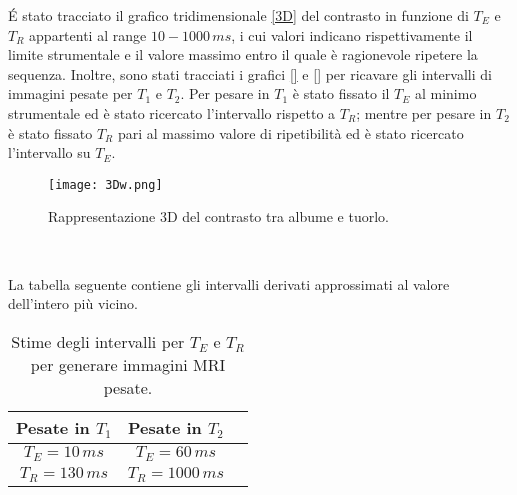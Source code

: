 \'E stato tracciato il grafico tridimensionale \ref{3D} del contrasto in funzione di $T_E$ e $T_R$ appartenti al range $10-1000\,ms$, i cui valori indicano rispettivamente il limite strumentale e il valore massimo entro il quale è ragionevole ripetere la sequenza. 
Inoltre, sono stati tracciati i grafici \ref{} e \ref{} per ricavare gli intervalli di immagini pesate per $T_1$ e $T_2$.
Per pesare in $T_1$ è stato fissato il $T_E$ al minimo strumentale ed è stato ricercato l'intervallo rispetto a $T_R$; mentre per pesare in $T_2$ è stato fissato $T_R$ pari al massimo valore di ripetibilità ed è stato ricercato l'intervallo su $T_E$.

\begin{figure}[h]
\centering
\texttt{[image: 3Dw.png]}
\caption{Rappresentazione 3D del contrasto tra albume e tuorlo.}
\label{fig:3D}
\end{figure}

\begin{figure}[h]
\centering
{} \quad
{} \\
\caption{}
\label{fig:Contrasto}
\end{figure}


La tabella seguente contiene gli intervalli derivati approssimati al valore dell'intero più vicino.


\begin{table}[h]
	\centering
	\begin{tabular}{ccc}
	\toprule
		\textbf{Pesate in $T_1$} &	\textbf{Pesate in $T_2$}	\\
	\midrule
		$T_E = 10\,ms$			&		$T_E = 60\,ms$	 \\	
		$T_R = 130\,ms$			&		$T_R = 1000\,ms$ \\
	\bottomrule
	\end{tabular}
	\caption{Stime degli intervalli per $T_E$ e $T_R$ per generare immagini MRI pesate.}	
	\label{tab:Pesate}
\end{table}